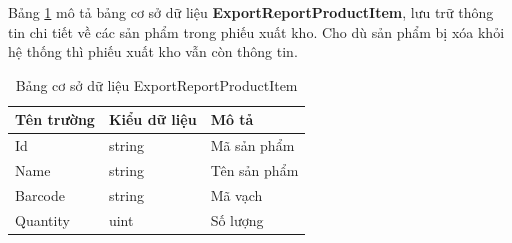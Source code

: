 \documentclass[../DoAn.tex]{subfiles}
\begin{document}
Bảng \ref{table:database_exportreportproductitem} mô tả bảng cơ sở dữ liệu \textbf{ExportReportProductItem}, lưu trữ thông tin chi tiết về các sản phẩm trong phiếu xuất kho. Cho dù sản phẩm bị xóa khỏi hệ thống thì phiếu xuất kho vẫn còn thông tin.
\begin{table}[H]
    \centering
    \begin{tabularx}{\textwidth}{|p{4cm}|p{3cm}|X|}
        \hline
        \textbf{Tên trường} & \textbf{Kiểu dữ liệu} & \textbf{Mô tả} \\ \hline
        Id                  & string                & Mã sản phẩm    \\ \hline
        Name                & string                & Tên sản phẩm   \\ \hline
        Barcode             & string                & Mã vạch        \\ \hline
        Quantity            & uint                  & Số lượng       \\ \hline
    \end{tabularx}
    \caption{Bảng cơ sở dữ liệu ExportReportProductItem}
    \label{table:database_exportreportproductitem}
\end{table}
\end{document}
